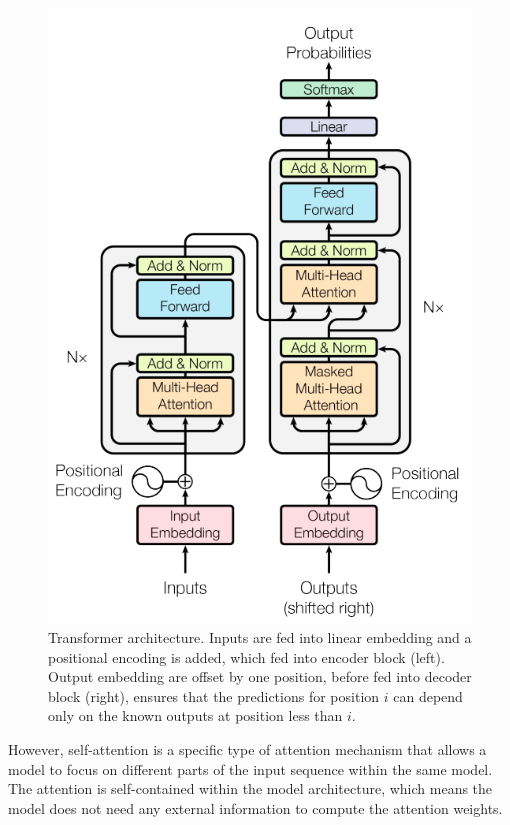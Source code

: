 \documentclass[conference]{IEEEtran}
\begin{document}
\begin{figure}[htbp]
\centerline{\includegraphics[scale=0.37]{Images/architecture.png}}
\caption{Transformer architecture. Inputs are fed into linear embedding and a positional encoding is added, which fed into encoder block (left). Output embedding are offset by one position, before fed into decoder block (right), ensures that the predictions for position \(i\) can depend only on the known outputs at position less than \(i\)\cite{b3}.}
\label{fig}
\end{figure}


However, self-attention is a specific type of attention mechanism that allows a model to focus on different parts of the input sequence within the same model. The attention is self-contained within the model architecture, which means the model does not need any external information to compute the attention weights. 
\end{document}
